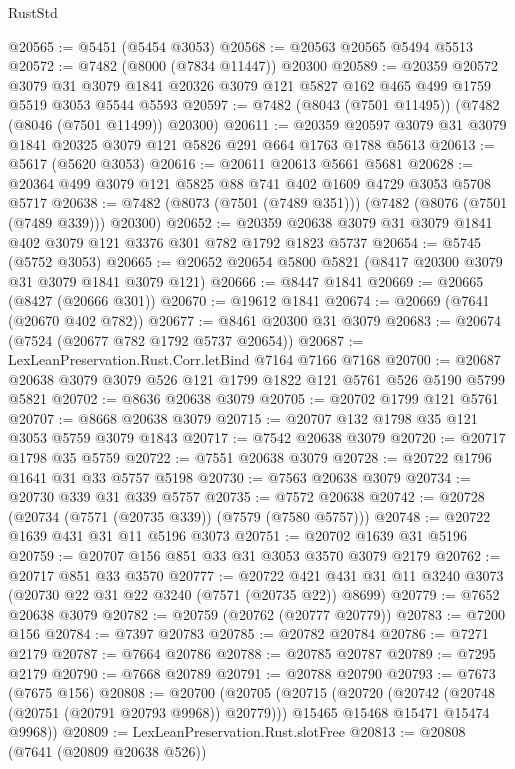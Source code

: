 \begin{lexlean}{RustStd}
\begin{coremodule}
{\begin{coremodule}
{{{{{{{{{{{{{{{{{{{{{{{{{{{{{{{{@20565 := @5451 (@5454 @3053)
@20568 := @20563 @20565 @5494 @5513
@20572 := @7482 (@8000 (@7834 @11447)) @20300
@20589 := @20359
    @20572
    @3079
    @31
    @3079
    @1841
    @20326
    @3079
    @121
    @5827
    @162
    @465
    @499
    @1759
    @5519
    @3053
    @5544
    @5593
@20597 := @7482 (@8043 (@7501 @11495)) (@7482 (@8046 (@7501 @11499)) @20300)
@20611 := @20359 @20597 @3079 @31 @3079 @1841 @20325 @3079 @121 @5826 @291 @664 @1763 @1788 @5613
@20613 := @5617 (@5620 @3053)
@20616 := @20611 @20613 @5661 @5681
@20628 := @20364 @499 @3079 @121 @5825 @88 @741 @402 @1609 @4729 @3053 @5708 @5717
@20638 := @7482 (@8073 (@7501 (@7489 @351))) (@7482 (@8076 (@7501 (@7489 @339))) @20300)
@20652 := @20359 @20638 @3079 @31 @3079 @1841 @402 @3079 @121 @3376 @301 @782 @1792 @1823 @5737
@20654 := @5745 (@5752 @3053)
@20665 := @20652 @20654 @5800 @5821 (@8417 @20300 @3079 @31 @3079 @1841 @3079 @121)
@20666 := @8447 @1841
@20669 := @20665 (@8427 (@20666 @301))
@20670 := @19612 @1841
@20674 := @20669 (@7641 (@20670 @402 @782))
@20677 := @8461 @20300 @31 @3079
@20683 := @20674 (@7524 (@20677 @782 @1792 @5737 @20654))
@20687 := LexLeanPreservation.Rust.Corr.letBind @7164 @7166 @7168
@20700 := @20687 @20638 @3079 @3079 @526 @121 @1799 @1822 @121 @5761 @526 @5190 @5799 @5821
@20702 := @8636 @20638 @3079
@20705 := @20702 @1799 @121 @5761
@20707 := @8668 @20638 @3079
@20715 := @20707 @132 @1798 @35 @121 @3053 @5759 @3079 @1843
@20717 := @7542 @20638 @3079
@20720 := @20717 @1798 @35 @5759
@20722 := @7551 @20638 @3079
@20728 := @20722 @1796 @1641 @31 @33 @5757 @5198
@20730 := @7563 @20638 @3079
@20734 := @20730 @339 @31 @339 @5757
@20735 := @7572 @20638
@20742 := @20728 (@20734 (@7571 (@20735 @339)) (@7579 (@7580 @5757)))
@20748 := @20722 @1639 @431 @31 @11 @5196 @3073
@20751 := @20702 @1639 @31 @5196
@20759 := @20707 @156 @851 @33 @31 @3053 @3570 @3079 @2179
@20762 := @20717 @851 @33 @3570
@20777 := @20722 @421 @431 @31 @11 @3240 @3073 (@20730 @22 @31 @22 @3240 (@7571 (@20735 @22)) @8699)
@20779 := @7652 @20638 @3079
@20782 := @20759 (@20762 (@20777 @20779))
@20783 := @7200 @156
@20784 := @7397 @20783
@20785 := @20782 @20784
@20786 := @7271 @2179
@20787 := @7664 @20786
@20788 := @20785 @20787
@20789 := @7295 @2179
@20790 := @7668 @20789
@20791 := @20788 @20790
@20793 := @7673 (@7675 @156)
@20808 := @20700
    (@20705
      (@20715
        (@20720 (@20742 (@20748 (@20751 (@20791 @20793 @9968)) @20779)))
        @15465
        @15468
        @15471
        @15474
        @9968))
@20809 := LexLeanPreservation.Rust.slotFree
@20813 := @20808 (@7641 (@20809 @20638 @526))
}}}}}}}}}}}}}}}}}}}}}}}}}}}}}}}}
\end{coremodule}}
\end{coremodule}
\end{lexlean}
